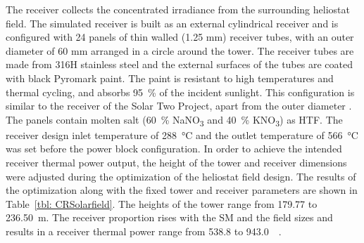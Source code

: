 The receiver collects the concentrated irradiance from the surrounding heliostat field. The simulated receiver is built as an external cylindrical receiver and is configured with 24 panels of thin walled (1.25 mm) receiver tubes, with an outer diameter of 60 mm arranged in a circle around the tower. The receiver tubes are made from 316H stainless steel and the external surfaces of the tubes are coated with black Pyromark paint. The paint is resistant to high temperatures and thermal cycling, and absorbs \SI{95}{\percent} of the incident sunlight. This configuration is similar to the receiver of the Solar Two Project, apart from the outer diameter \cite{Bradshaw2002}. The panels contain molten salt (\SI{60}{\percent} NaNO\textsubscript{3} and \SI{40}{\percent} KNO\textsubscript{3}) as \ac{HTF}. The receiver design inlet temperature of \SI{288}{\celsius} and the outlet temperature of \SI{566}{\celsius} was set before the power block configuration. In order to achieve the intended receiver thermal power output, the height of the tower and receiver dimensions were adjusted during the optimization of the heliostat field design. The results of the optimization along with the fixed tower and receiver parameters are shown in Table~\ref{tbl: CRSolarfield}. The heights of the tower range from \num{179.77} to \SI{236.50}{m}. The receiver proportion rises with the SM and the field sizes and results in a receiver thermal power range from 538.8 to \SI{943.0}{\mega\wattth}.


